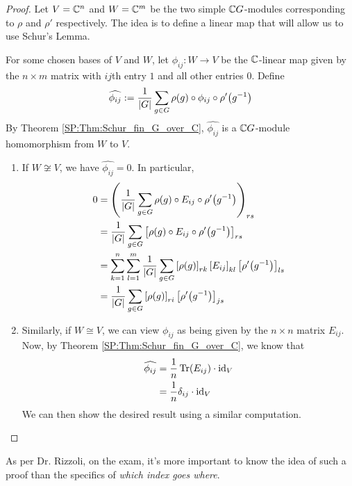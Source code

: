\begin{proof}
    Let $V = \mathbb{C}^n$ and $W = \mathbb{C}^m$ be the two simple $\mathbb{C} G$-modules corresponding to $\rho$ and $\rho'$ respectively. The idea is to define a linear map that will allow us to use Schur's Lemma.

    For some chosen bases of $V$ and $W$, let $\phi_{ij} : W \to V$ be the $\mathbb{C}$-linear map given by the $n \times m$ matrix with $ij$th entry $1$ and all other entries $0$. Define
    \begin{align*}  %
        \hat{\phi_{ij}} := \frac{1}{\abs{G}} \sum_{g \in G} \rho(g) \circ \phi_{ij} \circ \rho'\!\parenth{g\inv}
    \end{align*}
    By Theorem \ref{SP:Thm:Schur_fin_G_over_C}, $\hat{\phi_{ij}}$ is a $\mathbb{C} G$-module homomorphism from $W$ to $V$.
    \begin{enumerate}
        \item If $W \not\cong V$, we have $\hat{\phi_{ij}} = 0$. In particular,
        \begin{align*}
            0 &= \left( 
                \frac{1}{\left\lvert G \right\rvert} \sum_{g \in G} \rho(g) \circ E_{ij} \circ \rho'\!\left( g^{-1} \right)
             \right)_{rs} \\
            &= \frac{1}{\left\lvert G \right\rvert} \sum_{g \in G} \left[ \rho(g) \circ E_{ij} \circ \rho'\!\left( g^{-1} \right) \right]_{rs} \\
            &= \sum_{k=1}^{n} \sum_{l=1}^{m} \frac{1}{\left\lvert G \right\rvert} \sum_{g \in G} \left[ \rho(g) \right]_{rk} \left[ E_{ij} \right]_{kl} \left[ \rho'\!\left( g^{-1} \right) \right]_{ls} \\
            &= \frac{1}{\left\lvert G \right\rvert} \sum_{g \in G} \left[ \rho(g) \right]_{ri} \left[ \rho'\!\left( g^{-1} \right) \right]_{js}
        \end{align*}

        \item Similarly, if $W \cong V$, we can view $\phi_{ij}$ as being given by the $n \times n$ matrix $E_{ij}$. Now, by Theorem \ref{SP:Thm:Schur_fin_G_over_C}, we know that
        \begin{align*}
            \widehat{\phi_{ij}} &= \frac{1}{n} \operatorname{Tr}\!\left( E_{ij} \right) \cdot \operatorname{id}_V \\
            &= \frac{1}{n} \delta_{ij} \cdot \operatorname{id}_V
        \end{align*}
        We can then show the desired result using a similar computation.
    \end{enumerate}
\end{proof}
\begin{remark}
    As per Dr. Rizzoli, on the exam, it's more important to know the idea of such a proof than the specifics of \textit{which index goes where}.
\end{remark}

